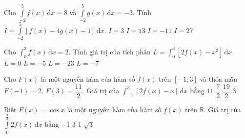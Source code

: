 \begin{ex}%
	Cho $\displaystyle\int\limits_{-2}^{5}f(x)\mathrm{\, d}x=8$ và $\displaystyle\int\limits_{-2}^{5}g(x)\mathrm{\, d}x=-3$. Tính $I=\displaystyle\int\limits_{-2}^{5}\left[f(x)-4g(x)-1\right]\mathrm{\, d}x$.
	\choice
	{$I=3$}
	{\True $I=13$}
	{$I=-11$}
	{$I=27$}
\end{ex}

\begin{ex}%
	Cho $\displaystyle\int_{0}^{3}f(x)\mathrm{\,d}x=2$. Tính giá trị của tích phân $L=\displaystyle\int_{0}^{3}\left[ 2f(x)-x^{2}\right] \mathrm{\,d}x$.
	\choice
	{$L=0$}
	{\True $L=-5$}
	{$L=-23$}
	{$L=-7$}
\end{ex}

%

\begin{ex}%
	Cho $F(x)$ là một nguyên hàm của hàm số $f(x)$ trên $\left[-1;3\right]$ và thỏa mãn $F(-1) = 2$, $F(3) = \dfrac{11}{2}$. Giá trị của $\displaystyle\int_{-1}^{3}\left[2f(x)-x\right]\mathrm{\,d}x$ bằng
	\choice
	{$11$}
	{$\dfrac{7}{2}$}
	{$\dfrac{19}{2}$}
	{\True $3$}
\end{ex}

%

\begin{ex}%
	Biết $F(x)=\cos x$ là một nguyên hàm của hàm số $f(x)$ trên $\mathbb{R}$. Giá trị của $\displaystyle\int\limits_0^{\tfrac{\pi}{3}} 2f(x)\mathrm{\,d}x$ bằng
	\choice
	{\True $-1$}
	{$3$}
	{$1$}
	{$\sqrt{3}$}
\end{ex}

